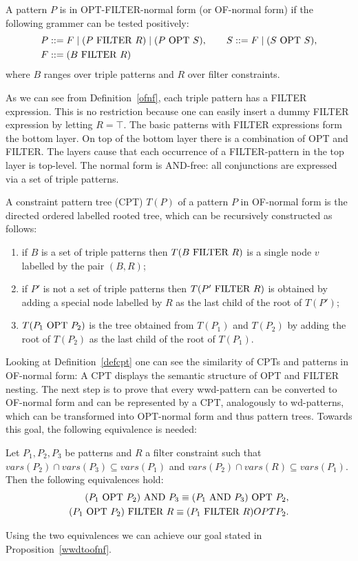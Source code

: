 \begin{definition}\label{ofnf}
	A pattern $P$ is in OPT-FILTER-normal form (or OF-normal form)
	if the following grammer can be tested positively:
	\begin{align*}
		&P ::=  F \mid (P \mbox{ FILTER } R) \mid (P \mbox{ OPT } S), \qquad S::= F\mid(S \mbox{ OPT } S),\\ 
	 &F ::=(B \mbox{ FILTER } R)
	\end{align*}
	where $B$ ranges over triple patterns and $R$ over filter
	constraints.
\end{definition}
As we can see from Definition~\ref{ofnf}, each triple pattern has a FILTER expression. 
This is no restriction because one can easily insert a dummy FILTER expression 
by letting $R = \top$. The basic patterns with FILTER expressions form the bottom layer.
On top of the bottom layer there is a combination of OPT and FILTER.
The layers cause that each occurrence of a FILTER-pattern in
the top layer is top-level. The normal form is AND-free: all conjunctions are
expressed via a set of triple patterns.

\begin{definition}\label{defcpt}
	A constraint pattern tree (CPT) $T(P)$ of a pattern $P$ in OF-normal form is
	the directed ordered labelled rooted tree, which can be recursively
	constructed as follows:
	\begin{enumerate}	
		\item if $B$ is a set of triple patterns then $T(B \mbox{ FILTER } R)$ is a single node
			$v$ labelled by the pair $(B,R)$;
		\item if $P'$ is not a set of triple patterns then $T(P' \mbox{ FILTER } R)$ is obtained
			by adding a special node labelled by $R$ as the last child of the
			root of $T(P')$;
		\item $T(P_1 \mbox{ OPT } P_2)$ is the tree obtained from $T(P_1)$ and $T(P_2)$
			by adding the root of $T(P_2)$ as the last child of the root of
			$T(P_1)$.
	\end{enumerate}
\end{definition}
Looking at Definition~\ref{defcpt} one can see the similarity of CPTs and
patterns in OF-normal form: A CPT displays the semantic structure of OPT and FILTER nesting.
The next step is to prove that every wwd-pattern can be converted to OF-normal
form and can be represented by a CPT, analogously to wd-patterns, which can be
transformed into  OPT-normal form and thus pattern trees. 
Towards this goal, the following equivalence is needed:
\begin{proposition}
	Let $P_1,P_2,P_3$ be patterns and $R$ a filter constraint such that
	$vars(P_2) \cap vars(P_3) \subseteq vars(P_1)$ and $vars(P_2) \cap vars(R)
	\subseteq vars(P_1)$. Then the following equivalences hold:
	\begin{align*}
		(P_1 \mbox{ OPT } P_2) \mbox{ AND } P_3 \equiv (P_1 \mbox{ AND } P_3) \mbox{ OPT } P_2,\\
		(P_1 \mbox{ OPT } P_2) \mbox{ FILTER } R \equiv (P_1 \mbox{ FILTER } R) OPT P_2.
	\end{align*}
\end{proposition}
Using the two equivalences we can achieve our goal stated in
Proposition~\ref{wwdtoofnf}.

